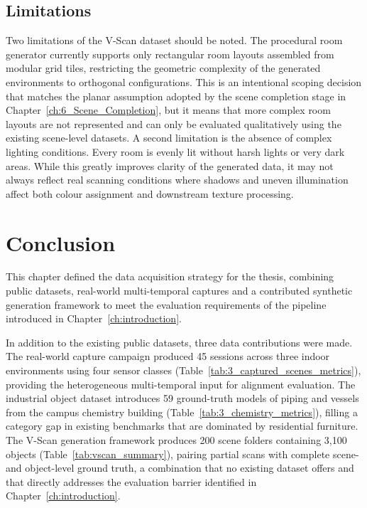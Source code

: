 \subsection{Limitations}
\label{sec:3_vscan_limitations}
 
Two limitations of the V-Scan dataset should be noted. The procedural room generator currently supports only rectangular room layouts assembled from modular grid tiles, restricting the geometric complexity of the generated environments to orthogonal configurations. This is an intentional scoping decision that matches the planar assumption adopted by the scene completion stage in Chapter~\ref{ch:6_Scene_Completion}, but it means that more complex room layouts are not represented and can only be evaluated qualitatively using the existing scene-level datasets. A second limitation is the absence of complex lighting conditions. Every room is evenly lit without harsh lights or very dark areas. While this greatly improves clarity of the generated data, it may not always reflect real scanning conditions where shadows and uneven illumination affect both colour assignment and downstream texture processing.

\section{Conclusion}
\label{sec:3_conclusion}
 
This chapter defined the data acquisition strategy for the thesis, combining public datasets, real-world multi-temporal captures and a contributed synthetic generation framework to meet the evaluation requirements of the pipeline introduced in Chapter~\ref{ch:introduction}.
 
In addition to the existing public datasets, three data contributions were made. The real-world capture campaign produced 45 sessions across three indoor environments using four sensor classes (Table~\ref{tab:3_captured_scenes_metrics}), providing the heterogeneous multi-temporal input for alignment evaluation. The industrial object dataset introduces 59 ground-truth models of piping and vessels from the campus chemistry building (Table~\ref{tab:3_chemistry_metrics}), filling a category gap in existing benchmarks that are dominated by residential furniture. The V-Scan generation framework produces 200 scene folders containing 3,100 objects (Table~\ref{tab:vscan_summary}), pairing partial scans with complete scene- and object-level ground truth, a combination that no existing dataset offers and that directly addresses the evaluation barrier identified in Chapter~\ref{ch:introduction}.
 
